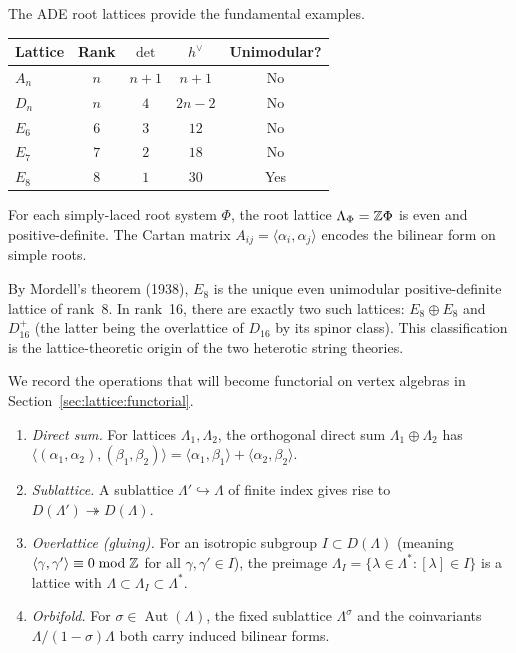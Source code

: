 \begin{example}\label{ex:lattice:root-lattices}
The ADE root lattices provide the fundamental examples.
\begin{center}
\begin{tabular}{l c c c c}
\textbf{Lattice} & \textbf{Rank} & $\det$ & $h^\vee$ & \textbf{Unimodular?} \\
\hline
$A_n$ & $n$ & $n+1$ & $n+1$ & No \\
$D_n$ & $n$ & $4$ & $2n-2$ & No \\
$E_6$ & $6$ & $3$ & $12$ & No \\
$E_7$ & $7$ & $2$ & $18$ & No \\
$E_8$ & $8$ & $1$ & $30$ & Yes
\end{tabular}
\end{center}
For each simply-laced root system $\Phi$, the root lattice
$\Lambda_\Phi = \mathbb{Z}\Phi$ is even and positive-definite.
The Cartan matrix $A_{ij} = \langle \alpha_i, \alpha_j \rangle$ encodes
the bilinear form on simple roots.
\end{example}

\begin{remark}\label{rem:lattice:e8-unique}
By Mordell's theorem (1938), $E_8$ is the unique even unimodular
positive-definite lattice of rank~8. In rank~16, there are exactly two
such lattices: $E_8 \oplus E_8$ and $D_{16}^+$ (the latter being the
overlattice of $D_{16}$ by its spinor class). This classification is
the lattice-theoretic origin of the two heterotic string theories.
\end{remark}

\begin{definition}\label{def:lattice:operations}
We record the operations that will become functorial on vertex algebras
in Section~\ref{sec:lattice:functorial}.
\begin{enumerate}[label=(\roman*)]
\item \emph{Direct sum.}
  For lattices $\Lambda_1, \Lambda_2$, the orthogonal direct sum
  $\Lambda_1 \oplus \Lambda_2$ has
  $\langle (\alpha_1, \alpha_2), (\beta_1, \beta_2) \rangle =
  \langle \alpha_1, \beta_1 \rangle + \langle \alpha_2, \beta_2 \rangle$.
\item \emph{Sublattice.}
  A sublattice $\Lambda' \hookrightarrow \Lambda$ of finite index
  gives rise to $D(\Lambda') \twoheadrightarrow D(\Lambda)$.
\item \emph{Overlattice (gluing).}
  For an isotropic subgroup $I \subset D(\Lambda)$ (meaning
  $\langle \gamma, \gamma' \rangle \equiv 0 \bmod \mathbb{Z}$ for all
  $\gamma, \gamma' \in I$), the preimage
  $\Lambda_I = \{\lambda \in \Lambda^* : [\lambda] \in I\}$ is a
  lattice with $\Lambda \subset \Lambda_I \subset \Lambda^*$.
\item \emph{Orbifold.}
  For $\sigma \in \operatorname{Aut}(\Lambda)$, the fixed sublattice
  $\Lambda^\sigma$ and the coinvariants $\Lambda/(1-\sigma)\Lambda$
  both carry induced bilinear forms.
\end{enumerate}
\end{definition}



